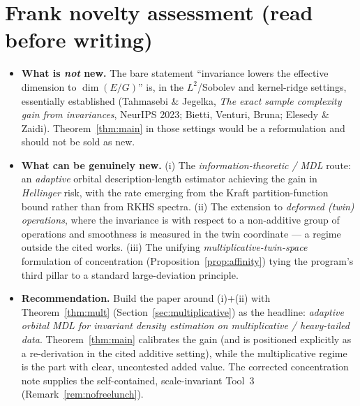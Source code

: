 \documentclass[11pt]{article}
\theoremstyle{plain}
\theoremstyle{definition}
\theoremstyle{remark}
\DeclareMathOperator{\dimm}{dim}
\begin{document}
\section{Frank novelty assessment (read before writing)}
\begin{itemize}[leftmargin=1.4em]
\item \textbf{What is \emph{not} new.} The bare statement ``invariance lowers the
effective dimension to $\dimm(E/G)$'' is, in the $L^2$/Sobolev and kernel-ridge
settings, essentially established (Tahmasebi \& Jegelka, \emph{The exact sample
complexity gain from invariances}, NeurIPS 2023; Bietti, Venturi, Bruna; Elesedy
\& Zaidi). Theorem~\ref{thm:main} in those settings would be a reformulation and
should not be sold as new.
\item \textbf{What can be genuinely new.} (i) The \emph{information-theoretic /
MDL} route: an \emph{adaptive} orbital description-length estimator achieving the
gain in \emph{Hellinger} risk, with the rate emerging from the Kraft
partition-function bound rather than from RKHS spectra. (ii) The extension to
\emph{deformed (twin) operations}, where the invariance is with respect to a
non-additive group of operations and smoothness is measured in the twin
coordinate --- a regime outside the cited works. (iii) The unifying
\emph{multiplicative-twin-space} formulation of concentration
(Proposition~\ref{prop:affinity}) tying the program's third pillar to a standard
large-deviation principle.
\item \textbf{Recommendation.} Build the paper around (i)+(ii) with
Theorem~\ref{thm:mult} (Section~\ref{sec:multiplicative}) as the headline:
\emph{adaptive orbital MDL for invariant density estimation on multiplicative /
heavy-tailed data}. Theorem~\ref{thm:main} calibrates the gain (and is positioned
explicitly as a re-derivation in the cited additive setting), while the
multiplicative regime is the part with clear, uncontested added value. The
corrected concentration note supplies the self-contained, scale-invariant Tool~3
(Remark~\ref{rem:nofreelunch}).
\end{itemize}
\end{document}
